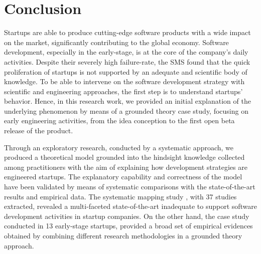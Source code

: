\documentclass[10pt,journal,letterpaper,compsoc]{IEEEtran}
\begin{document}
\section{Conclusion}
\label{conc}
Startups are able to produce cutting-edge software products with a wide impact 
on the market, significantly contributing to the global economy. Software 
development, especially in the early-stage, is at the core of the company's 
daily activities. Despite their severely high failure-rate, the SMS \cite{SMS} 
found that the quick proliferation of startups is not supported by an adequate 
and scientific body of knowledge. %
To be able to intervene on the software development strategy with scientific and 
engineering approaches, the first step is to understand startups' behavior. 
Hence, in this research work, we provided an initial explanation of the 
underlying phenomenon by means of a grounded theory case study, focusing on 
early engineering activities, from the idea conception to the first open beta 
release of the product.

Through an exploratory research, conducted by a systematic approach, we 
produced a theoretical model grounded into the hindsight knowledge collected 
among practitioners with the aim of explaining how development strategies are 
engineered startups. The explanatory capability and correctness of the model 
have been validated by means of systematic comparisons with the state-of-the-art 
results and empirical data. The systematic mapping study \cite{SMS}, 
with 37 studies extracted, revealed a 
multi-faceted state-of-the-art inadequate to support software development 
activities in startup companies. %
On the other hand, the case study conducted in 13 early-stage startups, 
provided a broad set of empirical evidences obtained by combining different 
research methodologies in a grounded theory approach.
\end{document}
